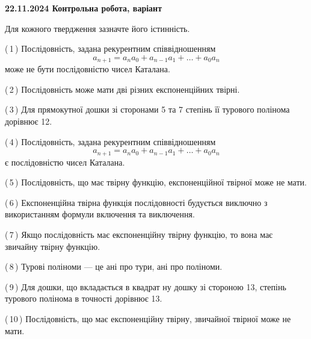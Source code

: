 \documentclass[12pt, ukrainian]{article}
\begin{document}
\begin {large}
\begin {large}
\begin {large}
\begin {large}
\begin {large}
{\vspace{5mm}
}
\newpage

\begin {large}

\textbf{22.11.2024 Контрольна робота, варіант  }\par


{
Для кожного твердження зазначте його істинність.\par

\vspace{2mm}

(\,1\,) Послідовність, задана рекурентним співвідношенням $$a_{n+1}=a_{n}a_{0}+a_{n-1}a_{1}+\ldots+a_0a_{n}$$ може не бути послідовністю чисел Каталана.%



(\,2\,) Послідовність може мати дві різних експоненційних твірні.%



(\,3\,) Для прямокутної дошки зі сторонами 5 та 7 степінь її турового полінома дорівнює 12.%



(\,4\,) Послідовність, задана рекурентним співвідношенням $$a_{n+1}=a_{n}a_{0}+a_{n-1}a_{1}+\ldots+a_0a_{n}$$ є послідовністю чисел Каталана.%



(\,5\,) Послідовність, що має твірну функцію, експоненційної твірної може не мати.%



(\,6\,) Експоненційна твірна функція послідовності будується виключно з використанням формули включення та виключення.%



(\,7\,) Якщо послідовність має експоненційну твірну функцію, то вона має звичайну твірну функцію.%



(\,8\,) Турові поліноми --- це ані про тури, ані про поліноми.%



(\,9\,) Для дошки, що вкладається в квадрат ну дошку зі стороною 13, степінь турового полінома в точності дорівнює 13.%



(\,10\,) Послідовність, що має експоненційну твірну, звичайної твірної може не мати.%




\vspace{5mm}
}
\newpage

\begin {large}


\end{large}
\end{large}
\end{large}
\end{large}
\end{large}
\end{large}
\end{large}
\end{document}
